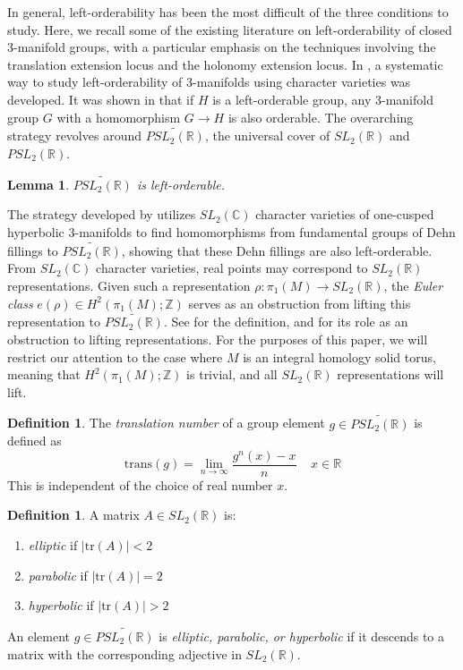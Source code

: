 \documentclass{article}
\theoremstyle{plain}
\theoremstyle{definition}
\newtheorem{definition}[theorem]{Definition}
\theoremstyle{plain}
\theoremstyle{plain}
\theoremstyle{plain}
\newtheorem{lemma}[theorem]{Lemma}
\theoremstyle{remark}
\theoremstyle{remark}
\theoremstyle{plain}
\theoremstyle{plain}
\begin{document}
In general, left-orderability has been the most difficult of the three conditions to study. Here, we recall some of the existing literature on left-orderability of closed 3-manifold groups, with a particular emphasis on the techniques involving the translation extension locus and the holonomy extension locus. In \cite{cullerdunfield}, a systematic way to study left-orderability of 3-manifolds using character varieties was developed. It was shown in \cite{wiest} that if $H$ is a left-orderable group, any 3-manifold group $G$ with a homomorphism $G \to H$ is also orderable. The overarching strategy revolves around $\widetilde{PSL_2(\mathbb{R})}$, the universal cover of $SL_2(\mathbb{R})$ and $PSL_2(\mathbb{R})$. 

\begin{lemma}\cite{ghys}
$\widetilde{PSL_2(\mathbb{R})}$ is left-orderable.
\end{lemma}

The strategy developed by \cite{cullerdunfield} utilizes $SL_2(\mathbb{C})$ character varieties of one-cusped hyperbolic 3-manifolds to find homomorphisms from fundamental groups of Dehn fillings to $\widetilde{PSL_2(\mathbb{R})}$, showing that these Dehn fillings are also left-orderable. From $SL_2(\mathbb{C})$ character varieties, real points may correspond to $SL_2(\mathbb{R})$ representations. Given such a representation $\rho: \pi_1(M) \to SL_2(\mathbb{R})$, the \emph{Euler class} $e(\rho) \in H^2(\pi_1(M); \mathbb{Z})$ serves as an obstruction from lifting this representation to $\widetilde{PSL_2(\mathbb{R})}$. See \cite{ghys} for the definition, and \cite{cullerdunfield} for its role as an obstruction to lifting representations. For the purposes of this paper, we will restrict our attention to the case where $M$ is an integral homology solid torus, meaning that $H^2(\pi_1(M); \mathbb{Z})$ is trivial, and all $SL_2(\mathbb{R})$ representations will lift. 

\begin{definition}
The \emph{translation number} of a group element $g \in \widetilde{PSL_2(\mathbb{R})}$ is defined as 
\begin{equation}
	\text{trans}(g) = \lim_{n \to \infty}\frac{g^n(x) - x}{n} \ \ \ \ \ x \in \mathbb{R}
\end{equation}
This is independent of the choice of real number $x$.
\end{definition}

\begin{definition}
A matrix $A \in SL_2(\mathbb{R})$ is:
\begin{enumerate}
	\item \emph{elliptic} if $|\text{tr}(A)| < 2$
	\item \emph{parabolic} if $|\text{tr}(A)| = 2$
	\item \emph{hyperbolic} if $|\text{tr}(A)| > 2$
\end{enumerate}
An element $g \in \widetilde{PSL_2(\mathbb{R})}$ is \emph{elliptic, parabolic, or hyperbolic} if it descends to a matrix with the corresponding adjective in $SL_2(\mathbb{R})$.
\end{definition}
\end{document}
